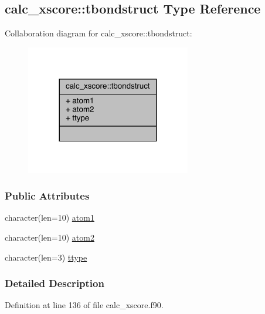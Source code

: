 \hypertarget{structcalc__xscore_1_1tbondstruct}{\subsection{calc\-\_\-xscore\-:\-:tbondstruct Type Reference}
\label{structcalc__xscore_1_1tbondstruct}
}


Collaboration diagram for calc\-\_\-xscore\-:\-:tbondstruct\-:
\nopagebreak
\begin{figure}[H]
\begin{center}
\leavevmode
\includegraphics[width=204pt]{structcalc__xscore_1_1tbondstruct__coll__graph}
\end{center}
\end{figure}
\subsubsection*{Public Attributes}
\begin{DoxyCompactItemize}
\item 
character(len=10) \hyperlink{structcalc__xscore_1_1tbondstruct_a808811a29fe2ba3f61e3fbfb0df57b95}{atom1}
\item 
character(len=10) \hyperlink{structcalc__xscore_1_1tbondstruct_a74934378fb21b88c85aa7939623f7456}{atom2}
\item 
character(len=3) \hyperlink{structcalc__xscore_1_1tbondstruct_a4e1125f95b5019636e97da68c5932c83}{ttype}
\end{DoxyCompactItemize}


\subsubsection{Detailed Description}


Definition at line 136 of file calc\-\_\-xscore.\-f90.



